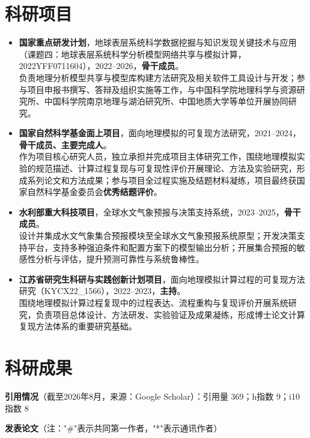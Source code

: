 \documentclass[a4paper,11pt]{article}
\newcommand{\cvitem}[1]{
  \item {\small #1}
}
\begin{document}
\section{科研项目}
\begin{itemize}[leftmargin=0.15in,label={$\bullet$},itemsep=5pt]
  \cvitem{\textbf{国家重点研发计划}，地球表层系统科学数据挖掘与知识发现关键技术与应用（课题四：地球表层系统科学分析模型网络共享与模拟计算，2022YFF0711604），2022--2026，\textbf{骨干成员}。\\
  负责地理分析模型共享与模型库构建方法研究及相关软件工具设计与开发；参与项目申报书撰写、答辩及组织实施等工作，与中国科学院地理科学与资源研究所、中国科学院南京地理与湖泊研究所、中国地质大学等单位开展协同研究。}

  \cvitem{\textbf{国家自然科学基金面上项目}，面向地理模拟的可复现方法研究，2021--2024，\textbf{骨干成员、主要完成人}。\\
  作为项目核心研究人员，独立承担并完成项目主体研究工作，围绕地理模拟实验的规范描述、计算过程复现与可复现性评价开展理论、方法及实验研究，形成系列论文和方法成果；参与项目全过程实施及结题材料凝练，项目最终获国家自然科学基金委员会\textbf{优秀结题评价}。}

  \cvitem{\textbf{水利部重大科技项目}，全球水文气象预报与决策支持系统，2023--2025，\textbf{骨干成员}。\\
  设计并集成水文气象集合预报模块至全球水文气象预报系统原型；开发决策支持平台，支持多种强迫条件和配置方案下的模型输出分析；开展集合预报的敏感性分析与评估，提升预测可靠性与系统鲁棒性。}

  \cvitem{\textbf{江苏省研究生科研与实践创新计划项目}，面向地理模拟计算过程的可复现方法研究（KYCX22\_1566），2022--2023，\textbf{主持}。\\
  围绕地理模拟计算过程复现中的过程表达、流程重构与复现评价开展系统研究，负责项目总体设计、方法研发、实验验证及成果凝练，形成博士论文计算复现方法体系的重要研究基础。}
\end{itemize}

\section{科研成果}
\small

\hspace{0.1in}\textbf{引用情况}（截至2026年8月，来源：Google Scholar）：引用量 369；h指数 9；i10指数 8
\vspace{6pt}

\hspace{0.1in}\textbf{发表论文}（注："\#"表示共同第一作者，"*"表示通讯作者）
\end{document}
